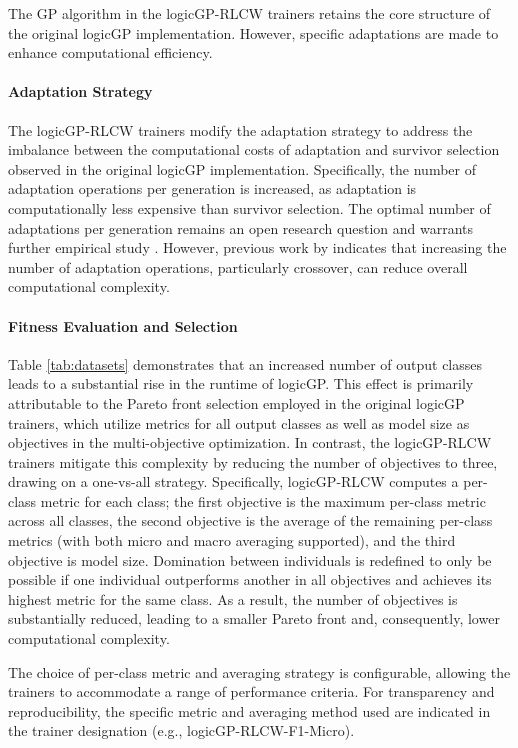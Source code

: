 \documentclass[a4paper,twoside]{article}
\begin{document}
The GP algorithm in the logicGP-RLCW trainers retains the core structure of the original logicGP implementation. However, specific adaptations are made to enhance computational efficiency.

\paragraph{Adaptation Strategy}

The logicGP-RLCW trainers modify the adaptation strategy to address the imbalance between the computational costs of adaptation and survivor selection observed in the original logicGP implementation. Specifically, the number of adaptation operations per generation is increased, as adaptation is computationally less expensive than survivor selection. The optimal number of adaptations per generation remains an open research question and warrants further empirical study \citep[cf.][]{info10120390}. However, previous work by \citet{Nunkesser2008b} indicates that increasing the number of adaptation operations, particularly crossover, can reduce overall computational complexity.

\paragraph{Fitness Evaluation and Selection}
Table \ref{tab:datasets} demonstrates that an increased number of output classes leads to a substantial rise in the runtime of logicGP. This effect is primarily attributable to the Pareto front selection employed in the original logicGP trainers, which utilize metrics for all output classes as well as model size as objectives in the multi-objective optimization. In contrast, the logicGP-RLCW trainers mitigate this complexity by reducing the number of objectives to three, drawing on a one-vs-all strategy. Specifically, logicGP-RLCW computes a per-class metric for each class; the first objective is the maximum per-class metric across all classes, the second objective is the average of the remaining per-class metrics (with both micro and macro averaging supported), and the third objective is model size. Domination between individuals is redefined to only be possible if one individual outperforms another in all objectives and achieves its highest metric for the same class. As a result, the number of objectives is substantially reduced, leading to a smaller Pareto front and, consequently, lower computational complexity.

The choice of per-class metric and averaging strategy is configurable, allowing the trainers to accommodate a range of performance criteria. For transparency and reproducibility, the specific metric and averaging method used are indicated in the trainer designation (e.g., logicGP-RLCW-F1-Micro).
\end{document}
